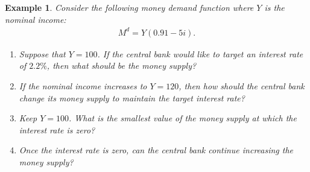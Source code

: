 \documentclass[12pt]{article}
\newtheorem{example}{Example}
\begin{document}
\begin{example}
	Consider the following money demand function where $Y$ is the nominal income:
	\begin{align*}
		M^d = Y (0.91-5i).
	\end{align*}
	
	\begin{enumerate}[label=(\alph*)]
		\item Suppose that $Y=100$. If the central bank would like to target an interest rate of $2.2\%$, then what should be the money supply?
		\vspace{36pt}
		\item If the nominal income increases to $Y=120$, then how should the central bank change its money supply to maintain the target interest rate?
		\vspace{36pt}
		\item Keep $Y=100$. What is the smallest value of the money supply at which the interest rate is zero?
		\vspace{36pt}
		\item Once the interest rate is zero, can the central bank continue increasing the money supply?
	\end{enumerate}
\end{example}
\end{document}
